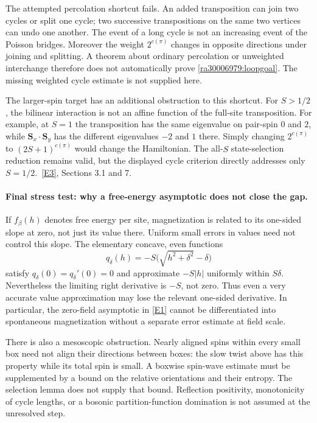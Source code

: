 \documentclass[11pt]{article}
\newcommand{\eref}[2]{\hyperlink{extra:#1:#2}{[E#2]}}
\begin{document}
	The attempted percolation shortcut fails. An added transposition can
	join two cycles or split one cycle; two successive transpositions on
	the same two vertices can undo one another. The event of a long cycle
	is not an increasing event of the Poisson bridges. Moreover the weight
	$2^{c(\pi)}$ changes in opposite directions under joining and splitting.
	A theorem about ordinary percolation or unweighted interchange therefore
	does not automatically prove \eqref{ra30006979:loopgoal}. The missing weighted
	cycle estimate is not supplied here.
	
	The larger-spin target has an additional obstruction to this shortcut.
	For $S>1/2$, the bilinear interaction is not an affine function of the
	full-site transposition. For example, at $S=1$ the transposition has
	the same eigenvalue on pair-spin $0$ and $2$, while
	$\mathbf S_x\cdot\mathbf S_y$ has the different eigenvalues $-2$ and
	$1$ there. Simply changing $2^{c(\pi)}$ to $(2S+1)^{c(\pi)}$ would
	change the Hamiltonian. The all-$S$ state-selection reduction remains
	valid, but the displayed cycle criterion directly addresses only
	$S=1/2$.\ \eref{30006979}{3}, Sections 3.1 and 7.
	
	\paragraph{Final stress test: why a free-energy asymptotic does not close the gap.}
	If $f_\beta(h)$ denotes free energy per site, magnetization is related
	to its one-sided slope at zero, not just its value there. Uniform
	small errors in values need not control this slope. The elementary
	concave, even functions
	\[
	q_\delta(h)=-S\bigl(\sqrt{h^2+\delta^2}-\delta\bigr)
	\]
	satisfy $q_\delta(0)=q_\delta'(0)=0$ and approximate $-S|h|$ uniformly
	within $S\delta$. Nevertheless the limiting right derivative is
	$-S$, not zero. Thus even a very accurate value approximation may
	lose the relevant one-sided derivative. In particular, the zero-field
	asymptotic in \eref{30006979}{1} cannot be differentiated into spontaneous
	magnetization without a separate error estimate at field scale.
	
	There is also a mesoscopic obstruction. Nearly aligned spins within
	every small box need not align their directions between boxes: the
	slow twist above has this property while its total spin is small.
	A boxwise spin-wave estimate must be supplemented by a bound on the
	relative orientations and their entropy. The selection lemma does
	not supply that bound. Reflection positivity, monotonicity of cycle
	lengths, or a bosonic partition-function domination is not assumed
	at the unresolved step.
	
\end{document}
